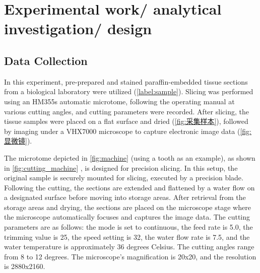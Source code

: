 \section{Experimental work/ analytical investigation/ design}

\subsection{Data Collection}
In this experiment, pre-prepared and stained paraffin-embedded tissue sections from a biological laboratory were utilized (\autoref{label:sample}). Slicing was performed using an HM355s automatic microtome, following the operating manual at various cutting angles, and cutting parameters were recorded. After slicing, the tissue samples were placed on a flat surface and dried (\autoref{fig:采集样本}), followed by imaging under a VHX7000 microscope to capture electronic image data (\autoref{fig:显微镜}).

The microtome depicted in \autoref{fig:machine} (using a tooth as an example), as shown in \autoref{fig:cutting_machine} \cite{4.1}, is designed for precision slicing. In this setup, the original sample is securely mounted for slicing, executed by a precision blade. Following the cutting, the sections are extended and flattened by a water flow on a designated surface before moving into storage areas. After retrieval from the storage areas and drying, the sections are placed on the microscope stage where the microscope automatically focuses and captures the image data. The cutting parameters are as follows: the mode is set to continuous, the feed rate is 5.0, the trimming value is 25, the speed setting is 32, the water flow rate is 7.5, and the water temperature is approximately 36 degrees Celsius. The cutting angles range from 8 to 12 degrees. The microscope's magnification is 20x20, and the resolution is 2880x2160.

